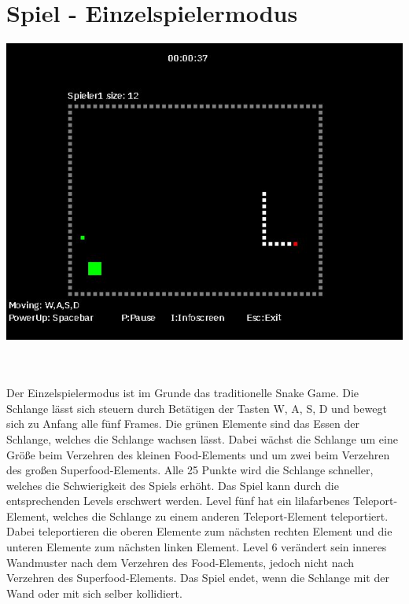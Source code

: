 \section{Spiel - Einzelspielermodus}
\label{Spiel_-_Einzelspielermodus}
%
\begin{minipage}[X]{1.1\textwidth}
 \centering
 \includegraphics[scale=0.5]{bilder/Einzelspielermodus}
 \label{fig:einzelspielermodus}
\end{minipage}
\newline \\ \\
	Der Einzelspielermodus ist im Grunde das traditionelle Snake Game. Die Schlange l{\"a}sst sich steuern durch Bet{\"a}tigen der Tasten \glqq W\grqq{}, \glqq  A\grqq{}, \glqq S\grqq{}, \glqq D\grqq{} und bewegt sich zu Anfang alle f{\"u}nf Frames. Die gr{\"u}nen Elemente sind das Essen der Schlange, welches die Schlange wachsen l{\"a}sst. Dabei w{\"a}chst die Schlange um eine Gr{\"o}{\ss}e beim Verzehren des kleinen Food-Elements und um zwei beim Verzehren des gro{\ss}en Superfood-Elements. Alle 25 Punkte wird die Schlange schneller, welches die Schwierigkeit des Spiels erhöht.
	Das Spiel kann durch die entsprechenden Levels erschwert werden. Level f{\"u}nf hat ein lilafarbenes Teleport-Element, welches die Schlange zu einem anderen Teleport-Element teleportiert. Dabei teleportieren die oberen Elemente zum n{\"a}chsten rechten Element und die unteren Elemente zum n{\"a}chsten linken Element. Level 6 ver{\"a}ndert sein inneres Wandmuster nach dem Verzehren des Food-Elements, jedoch nicht nach Verzehren des Superfood-Elements. Das Spiel endet, wenn die Schlange mit der Wand oder mit sich selber kollidiert.   

